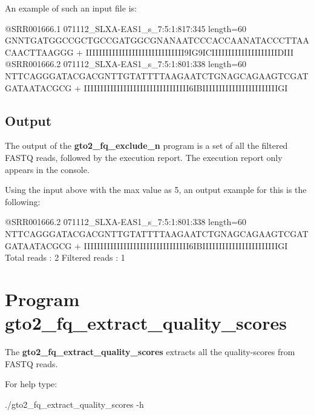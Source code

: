 \documentclass[11pt,]{krantz}
\newenvironment{Shaded}{\begin{snugshade}}{\end{snugshade}}
\newcommand{\ExtensionTok}[1]{#1}
\newcommand{\NormalTok}[1]{#1}
\begin{document}
An example of such an input file is:

\begin{Shaded}
\begin{Highlighting}[]
\ExtensionTok{@SRR001666.1}\NormalTok{ 071112_SLXA-EAS1_s_7:5:1:817:345 length=60}
\ExtensionTok{GNNTGATGGCCGCTGCCGATGGCGNANAATCCCACCAANATACCCTTAACAACTTAAGGG}
\ExtensionTok{+}
\ExtensionTok{IIIIIIIIIIIIIIIIIIIIIIIIIIIIII9IG9ICIIIIIIIIIIIIIIIIIIIIDIII}
\ExtensionTok{@SRR001666.2}\NormalTok{ 071112_SLXA-EAS1_s_7:5:1:801:338 length=60}
\ExtensionTok{NTTCAGGGATACGACGNTTGTATTTTAAGAATCTGNAGCAGAAGTCGATGATAATACGCG}
\ExtensionTok{+}
\ExtensionTok{IIIIIIIIIIIIIIIIIIIIIIIIIIIIIIII6IBIIIIIIIIIIIIIIIIIIIIIIIGI}
\end{Highlighting}
\end{Shaded}

\subsection*{Output}\label{output-2}


The output of the \textbf{gto2\_fq\_exclude\_n} program is a set of all
the filtered FASTQ reads, followed by the execution report. The
execution report only appears in the console.

Using the input above with the max value as 5, an output example for
this is the following:

\begin{Shaded}
\begin{Highlighting}[]
\ExtensionTok{@SRR001666.2}\NormalTok{ 071112_SLXA-EAS1_s_7:5:1:801:338 length=60}
\ExtensionTok{NTTCAGGGATACGACGNTTGTATTTTAAGAATCTGNAGCAGAAGTCGATGATAATACGCG}
\ExtensionTok{+}
\ExtensionTok{IIIIIIIIIIIIIIIIIIIIIIIIIIIIIIII6IBIIIIIIIIIIIIIIIIIIIIIIIGI}
\ExtensionTok{Total}\NormalTok{ reads    : 2}
\ExtensionTok{Filtered}\NormalTok{ reads : 1}
\end{Highlighting}
\end{Shaded}

\section{Program
gto2\_fq\_extract\_quality\_scores}\label{program-gto2_fq_extract_quality_scores}

The \textbf{gto2\_fq\_extract\_quality\_scores} extracts all the
quality-scores from FASTQ reads.

For help type:

\begin{Shaded}
\begin{Highlighting}[]
\ExtensionTok{./gto2_fq_extract_quality_scores}\NormalTok{ -h}
\end{Highlighting}
\end{Shaded}
\end{document}
